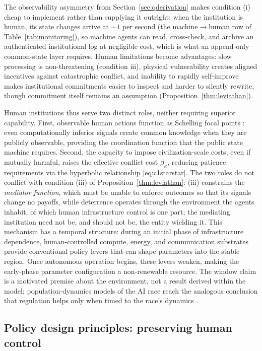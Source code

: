 \documentclass[manuscript,screen,review]{jair}
\begin{document}
The observability asymmetry from Section~\ref{sec:qderivation} makes condition (i) cheap to implement rather than supplying it outright: when the institution is human, its state changes arrive at ${\sim}1$ per second (the machine$\to$human row of Table~\ref{tab:monitoring}), so machine agents can read, cross-check, and archive an authenticated institutional log at negligible cost, which is what an append-only common-state layer requires. Human limitations become advantages: slow processing is non-threatening (condition iii), physical vulnerability creates aligned incentives against catastrophic conflict, and inability to rapidly self-improve makes institutional commitments easier to inspect and harder to silently rewrite, though commitment itself remains an assumption (Proposition~\ref{thm:leviathan}).

Human institutions thus serve two distinct roles, neither requiring superior capability. First, observable human actions function as Schelling focal points \cite{schelling.1960}: even computationally inferior signals create common knowledge when they are publicly observable, providing the coordination function that the public state machine requires. Second, the capacity to impose civilization-scale costs, even if mutually harmful, raises the effective conflict cost $\beta_\kappa$, reducing patience requirements via the hyperbolic relationship \eqref{eq:c1starstar}. The two roles do not conflict with condition (iii) of Proposition~\ref{thm:leviathan}: (iii) constrains the \emph{mediator function}, which must be unable to enforce outcomes so that its signals change no payoffs, while deterrence operates through the environment the agents inhabit, of which human infrastructure control is one part; the mediating institution need not be, and should not be, the entity wielding it. This mechanism has a temporal structure: during an initial phase of infrastructure dependence, human-controlled compute, energy, and communication substrates provide conventional policy levers that can shape parameters into the stable region. Once autonomous operation begins, these levers weaken, making the early-phase parameter configuration a non-renewable resource. The window claim is a motivated premise about the environment, not a result derived within the model; population-dynamics models of the AI race reach the analogous conclusion that regulation helps only when timed to the race's dynamics \cite{han.2020}.

\subsection{Policy design principles: preserving human control}
\label{sec:policy}
\end{document}

